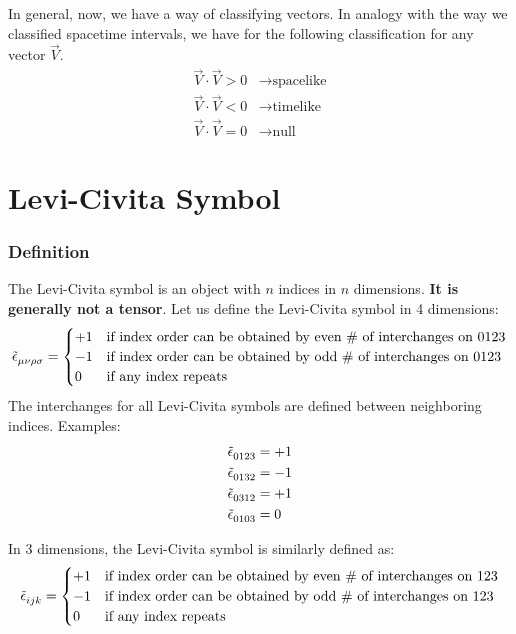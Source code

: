 \documentclass[11pt]{article}
\begin{document}
In general, now, we have a way of classifying vectors. In analogy with the way we classified spacetime intervals, we have for the following classification for any vector $\vec{V}$.
\begin{align}
\vec{V}\cdot\vec{V}>0&\rightarrow 
  \text{spacelike} \\
\vec{V}\cdot\vec{V}<0&\rightarrow 
  \text{timelike} \\
\vec{V}\cdot\vec{V}=0&\rightarrow 
  \text{null}
\end{align}


\part{Levi-Civita Symbol}
\section{Definition}

The Levi-Civita symbol is an object with $n$ indices in $n$ dimensions. \textbf{It is generally not a tensor}. Let us define the Levi-Civita symbol in 4 dimensions:
\begin{equation}
  \tensor{\tilde{\epsilon}}{_\mu_\nu_\rho_\sigma} =
  \begin{cases}
                                   +1 & \text{if index order can be obtained by even \# of interchanges on 0123} \\
                                   -1 & \text{if index order can be obtained by odd \# of interchanges on 0123} \\
 0 & \text{if any index repeats}
  \end{cases}
\end{equation}
\noindent The interchanges for all Levi-Civita symbols are defined between neighboring indices. Examples:
\begin{align*}
    \tensor{\tilde{\epsilon}}{_0_1_2_3}&    =+1 \\
    \tensor{\tilde{\epsilon}}{_0_1_3_2}&    =-1 \\
    \tensor{\tilde{\epsilon}}{_0_3_1_2}&    =+1 \\
    \tensor{\tilde{\epsilon}}{_0_1_0_3}&    =0
\end{align*}

\noindent In 3 dimensions, the Levi-Civita symbol is similarly defined as:
\begin{equation}
  \tensor{\tilde{\epsilon}}{_i_j_k} =
  \begin{cases}
                                   +1 & \text{if index order can be obtained by even \# of interchanges on 123} \\
                                   -1 & \text{if index order can be obtained by odd \# of interchanges on 123} \\
 0 & \text{if any index repeats}
  \end{cases}
\end{equation}
\end{document}

